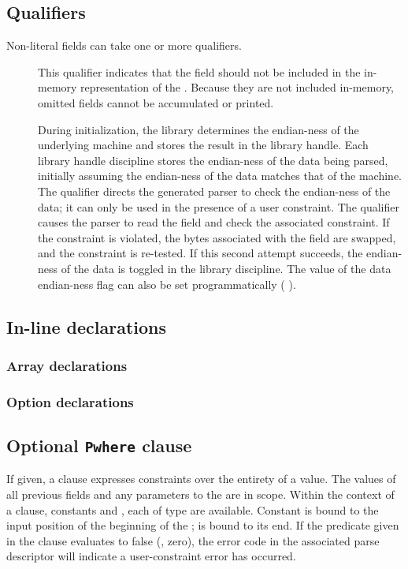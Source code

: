 \subsection{Qualifiers}
\label{sec:structs-qualifiers}
Non-literal fields can take one or more qualifiers.
\begin{description}
\item[\Pomit{}] This qualifier indicates that the field
  should not be included in the in-memory representation of the
  \Pstruct{}.  Because they are not included in-memory, omitted fields
  cannot be accumulated or printed.
\item[\Pendian{}] During initialization, the \PADS{} library
  determines the endian-ness of the underlying machine and stores the
  result in the library handle.  Each library handle discipline stores
  the endian-ness of the data being parsed, initially assuming the
  endian-ness of the data matches that of the machine.  The \Pendian{}
  qualifier directs the generated parser to check the endian-ness of
  the data; it can only be used in the presence of a user constraint.
  The qualifier causes the parser to read the field and check the
  associated constraint.  If the constraint is violated, the bytes
  associated with the field are swapped, and the constraint is
  re-tested.  If this second attempt succeeds, the endian-ness of the
  data is toggled in the library discipline.  The value of the data
  endian-ness flag can also be set programmatically (\cf
  ).
\end{description}

\subsection{In-line declarations}
\label{sec:structs-inline}
\subsubsection{Array declarations}
\label{sec:arrays-inline}
\subsubsection{Option declarations}
\label{sec:options-inline}

\subsection{Optional \texttt{Pwhere} clause}
If given, a \Pwhere{} clause expresses constraints over the entirety
of a \Pstruct{} value.  The values of all previous fields and any
parameters to the \Pstruct{} are in scope.  Within the context of a 
\Pparsecheck{} clause, constants  and , each of type 
\Ppost{} are available.  Constant  is bound to the input
position of the beginning of the \pstruct{};  is bound to its end.
If the predicate given in
the \Pwhere{} clause evaluates to false (\ie{}, zero), the error code
in the associated parse descriptor will indicate a user-constraint
error has occurred.  

